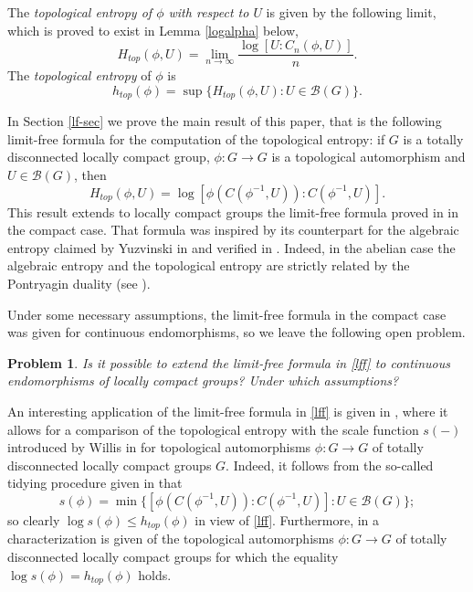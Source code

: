 \documentclass[11pt]{article}
\newtheorem{problem}[theorem]{Problem}
\theoremstyle{definition}
\numberwithin{equation}{section}
\begin{document}
The \emph{topological entropy of $\phi$ with respect to $U$} is given by the following limit, which is proved to exist in Lemma \ref{logalpha} below,
$$H_{top}(\phi,U)=\lim_{n\to \infty}\frac{\log[U:C_n(\phi,U)]}{n}.$$
The \emph{topological entropy} of $\phi$ is $$h_{top}(\phi)=\sup\{H_{top}(\phi,U):U\in\mathcal B(G)\}.$$

\medskip
In Section \ref{lf-sec} we prove the main result of this paper, that is the following limit-free formula for the computation of the topological entropy: if $G$ is a totally disconnected locally compact group, $\phi:G\to G$ is a topological automorphism and $U\in\mathcal B(G)$, then
\begin{equation}\label{lff}
H_{top}(\phi,U)=\log[\phi(C(\phi^{-1},U)):C(\phi^{-1},U)].
\end{equation}
This result extends to locally compact groups the limit-free formula proved in \cite{DG-limitfree} in the compact case. That formula was inspired by its counterpart for the algebraic entropy claimed by Yuzvinski in \cite{Y} and verified in \cite{DG-limitfree}. Indeed, in the abelian case the algebraic entropy and the topological entropy are strictly related by the Pontryagin duality (see \cite{DG-BT2,DG-BT,W}).

\medskip
Under some necessary assumptions, the limit-free formula in the compact case was given for continuous endomorphisms, so we leave the following open problem.

\begin{problem}
Is it possible to extend the limit-free formula in \eqref{lff} to continuous endomorphisms of locally compact groups? Under which assumptions?
\end{problem}

An interesting application of the limit-free formula in \eqref{lff} is given in \cite{BDG}, where it allows for a comparison of the topological entropy with the scale function $s(-)$ introduced by Willis in \cite{Willis,Willis2} for topological automorphisms $\phi:G\to G$ of totally disconnected locally compact groups $G$. Indeed, it follows from the so-called tidying procedure given in \cite{Willis2} that
$$s(\phi)=\min\{[\phi(C(\phi^{-1},U)):C(\phi^{-1},U)]:U\in\mathcal B(G)\};$$
so clearly $\log s(\phi)\leq h_{top}(\phi)$ in view of \eqref{lff}.
Furthermore, in \cite{BDG} a characterization is given of the topological automorphisms $\phi:G\to G$ of totally disconnected locally compact groups for which the equality $\log s(\phi)=h_{top}(\phi)$ holds.
\end{document}
